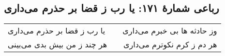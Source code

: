 \begin{center}
\section*{رباعی شمارهٔ ۱۷۱: یا رب ز قضا بر حذرم می‌داری}
\label{sec:171}
\begin{longtable}{l p{0.5cm} r}
یا رب ز قضا بر حذرم می‌داری
&&
وز حادثه ها بی خبرم می‌داری
\\
هر چند ز من بیش بدی می‌بینی
&&
هر دم ز کرم نکوترم می‌داری
\\
\end{longtable}
\end{center}
